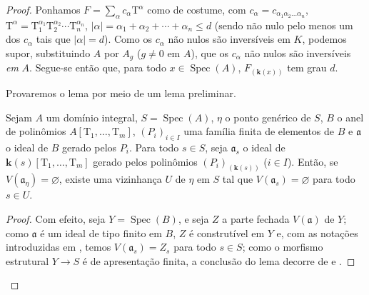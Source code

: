 \begin{proof}
Ponhamos $F=\sum_\alpha c_\alpha \mathrm{T}^\alpha$ como de costume, com $c_\alpha=c_{\alpha_1\alpha_2\ldots\alpha_n}$, $\mathrm{T}^\alpha=\mathrm{T}_1^{\alpha_1}\mathrm{T}_2^{\alpha_2}\cdots\mathrm{T}_n^{\alpha_n}$, $|\alpha|=\alpha_1+\alpha_2+\cdots+\alpha_n\leqslant d$ (sendo não nulo pelo menos um dos $c_\alpha$ tais que $|\alpha|=d$).
Como os $c_\alpha$ não nulos são inversíveis em $K$, podemos supor, substituindo $A$ por $A_g$ ($g\neq 0$ em $A$), que os $c_\alpha$ não nulos são inversíveis \emph{em} $A$.
Segue-se então que, para todo $x\in\operatorname{Spec}(A)$, $F_{(\boldsymbol{k}(x))}$ tem grau $d$.

Provaremos o lema por meio de um lema preliminar.

\begin{lemma}[9.7.5.1]
\label{IV.9.7.5.1}
Sejam $A$ um domínio integral, $S=\operatorname{Spec}(A)$, $\eta$ o ponto genérico de $S$, $B$ o anel de polinômios $A[\mathrm{T}_1,\ldots,\mathrm{T}_m]$, $(P_i)_{i\in I}$ uma família finita de elementos de $B$ e $\mathfrak{a}$ o ideal de $B$ gerado pelos $P_i$.
Para todo $s\in S$, seja $\mathfrak{a}_s$ o ideal de $\boldsymbol{k}(s)[\mathrm{T}_1,\ldots,\mathrm{T}_m]$ gerado pelos polinômios $(P_i)_{(\boldsymbol{k}(s))}$ ($i\in I$).
Então, se $V(\mathfrak{a}_\eta)=\varnothing$, existe uma vizinhança $U$ de $\eta$ em $S$ tal que $V(\mathfrak{a}_s)=\varnothing$ para todo $s\in U$.
\end{lemma}

\begin{proof}
Com efeito, seja $Y=\operatorname{Spec}(B)$, e seja $Z$ a parte fechada $V(\mathfrak{a})$ de $Y$; como $\mathfrak{a}$ é um ideal de tipo finito em $B$, $Z$ é construtível em $Y$  e, com as notações introduzidas em , temos $V(\mathfrak{a}_s)=Z_s$ para todo $s\in S$; como o morfismo estrutural $Y\to S$ é de apresentação finita, a conclusão do lema decorre de  e .
\end{proof}


\end{proof}
